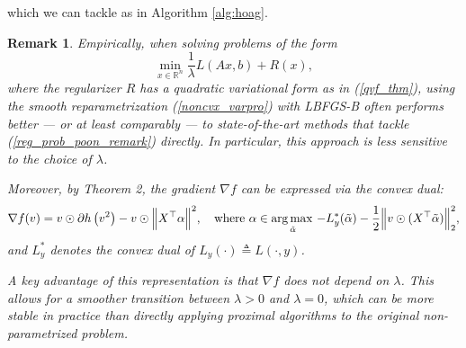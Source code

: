 \documentclass[11pt, twoside]{report}
\newtheorem{remark}{Remark}[theorem]
\begin{document}
which we can tackle as in Algorithm \ref{alg:hoag}. 

\begin{remark}
    Empirically, when solving problems of the form
    \begin{equation} \label{reg_prob_poon_remark}
        \min_{x \in \mathbb{R}^n} \frac{1}{\lambda} L(Ax,b) + R(x),
    \end{equation}
    where the regularizer $R$ has a quadratic variational form as in (\ref{qvf_thm}), using the smooth reparametrization (\ref{noncvx_varpro}) with LBFGS-B often performs better — or at least comparably — to state-of-the-art methods that tackle (\ref{reg_prob_poon_remark}) directly. In particular, this approach is less sensitive to the choice of $\lambda$.

    Moreover, by Theorem 2\cite{poon}, the gradient $\nabla f$ can be expressed via the convex dual:
    \begin{equation*}
        \nabla f(v) = v \odot \partial h\left(v^2\right) - v \odot \Big\|X^\top \alpha\Big\|^2,
        \quad \text{where } \alpha \in \operatorname*{arg\, max \,}_{\tilde{\alpha}} - L_y^*(\tilde{\alpha}) - \frac{1}{2}\Big\|v \odot (X^\top \tilde{\alpha})\Big\|_2^2,
    \end{equation*}
    and $L_y^*$ denotes the convex dual of $L_y(\cdot) \triangleq L(\cdot,y)$. 

    A key advantage of this representation is that $\nabla f$ does not depend on $\lambda$. This allows for a smoother transition between $\lambda > 0$ and $\lambda = 0$, which can be more stable in practice than directly applying proximal algorithms to the original non-parametrized problem.
\end{remark}
\end{document}
